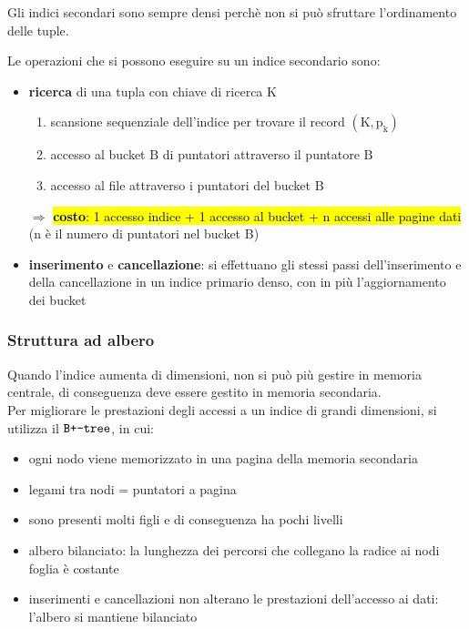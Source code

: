 \begin{itemize}[label=$\triangleright$, itemsep=\medskipamount]
Gli indici secondari sono sempre densi perchè non si può sfruttare l'ordinamento delle tuple.

Le operazioni che si possono eseguire su un indice secondario sono:
\begin{itemize}[label=$\diamond$, itemsep=\medskipamount]
  \item \textbf{ricerca} di una tupla con chiave di ricerca $\mathrm{K}$
  \begin{enumerate}[itemsep=\smallskipamount]
    \item scansione sequenziale dell'indice per trovare il record $\mathrm{(K, p_k)}$
    \item accesso al bucket $\mathrm{B}$ di puntatori attraverso il puntatore $\mathrm{B}$
    \item accesso al file attraverso i puntatori del bucket $\mathrm{B}$
  \end{enumerate}
  
  $\Rightarrow$ \hl{\textbf{costo}: 1 accesso indice + 1 accesso al bucket + n accessi alle pagine dati} (n è il numero di puntatori nel bucket B)
  \item  \textbf{inserimento} e \textbf{cancellazione}: si effettuano gli stessi passi dell'inserimento e della cancellazione in un indice primario denso, con in più l'aggiornamento dei bucket
\end{itemize}
\end{itemize}

\subsubsection{Struttura ad albero}
Quando l'indice aumenta di dimensioni, non si può più gestire in memoria centrale, di conseguenza deve essere gestito in memoria secondaria.\\[0.2ex]
Per migliorare le prestazioni degli accessi a un indice di grandi dimensioni, si utilizza il $\verb|B+-tree|$, in cui:
\begin{itemize}[label=$\triangleright$, itemsep=\smallskipamount]
  \item ogni nodo viene memorizzato in una pagina della memoria secondaria
  \item legami tra nodi = puntatori a pagina
  \item sono presenti molti figli e di conseguenza ha pochi livelli
  \item albero bilanciato: la lunghezza dei percorsi che collegano la radice ai nodi foglia è costante
  \item inserimenti e cancellazioni non alterano le prestazioni dell'accesso ai dati: l'albero si mantiene bilanciato
\end{itemize}

